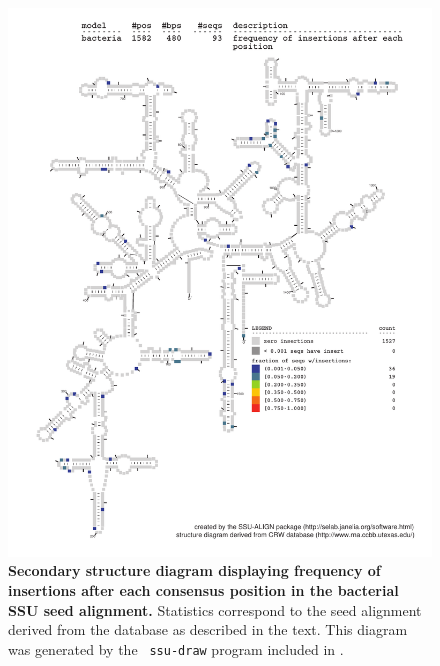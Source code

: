 \begin{figure}
\begin{center}
\includegraphics[width=5.7in]{Figures/bacteria-0p1-ifreq}
\end{center}
\caption[Secondary structure diagram displaying frequency of insertions
  after each consensus position in the bacterial SSU seed
  alignment]{\textbf{Secondary structure diagram displaying frequency
  of insertions after each consensus position in the bacterial SSU seed
  alignment.} Statistics correspond to the  seed
  alignment derived from the  database \cite{CannoneGutell02}
  as described in the text. This diagram was generated by the {\tt
  ssu-draw} program included in .}
\label{fig:bacifreq}
\end{figure}


